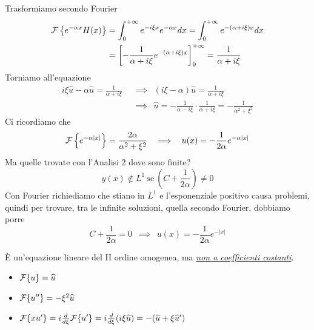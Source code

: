 Trasformiamo secondo Fourier
\begin{equation*}
\begin{aligned}
\mathcal{F} \left\{e^{- \alpha x} H(x)\right\} & = \int^{+ \infty}_{0} e^{- i\xi x} e^{- \alpha x} dx = \int^{+ \infty}_{0} e^{- (\alpha + i\xi) x} dx\\
 & = \left[ - \frac{1}{\alpha + i\xi} e^{- (\alpha + i\xi) x}\right]^{+ \infty}_{0} = \frac{1}{\alpha + i\xi}
\end{aligned}
\end{equation*}
Torniamo all'equazione
\begin{equation*}
\begin{aligned}
i\xi \hat{u} - \alpha \hat{u} = \frac{1}{\alpha + i\xi} \ \  & \implies \ \ (i\xi - \alpha)\hat{u} = \frac{1}{\alpha + i\xi}\\
 & \implies \ \ \hat{u} = - \frac{1}{\alpha - i\xi} \cdot \frac{1}{\alpha + i\xi} = - \frac{1}{\alpha^{2} + \xi^{2}}
\end{aligned}
\end{equation*}
Ci ricordiamo che
\begin{equation*}
\mathcal{F} \left\{e^{- \alpha | x|}\right\} = \frac{2\alpha}{\alpha^{2} + \xi^{2}} \ \ \implies \ \ u(x) = - \frac{1}{2\alpha} e^{- \alpha | x|}
\end{equation*}
Ma quelle trovate con l'Analisi 2 dove sono finite?
\begin{equation*}
y(x) \notin L^{1} \ \text{se} \ \left(C + \frac{1}{2\alpha}\right) \neq 0
\end{equation*}
Con Fourier richiediamo che stiano in $L^{1}$ e l'esponenziale positivo causa problemi, quindi per trovare, tra le infinite soluzioni, quella secondo Fourier, dobbiamo porre
\begin{equation*}
C + \frac{1}{2\alpha} = 0\ \ \implies \ \ u(x) = - \frac{1}{2\alpha} e^{- | x|}
\end{equation*}
\Soluzione

È un'equazione lineare del II ordine omogenea, ma \textit{\underline{non a coefficienti costanti}}.
\begin{itemize}
\item $\mathcal{F} \{u\} = \widehat{u}$
\item $\mathcal{F} \{u''\} = - \xi^{2}\widehat{u}$
\item $\mathcal{F} \{xu'\} = i\frac{d}{d\xi}\mathcal{F} \{u'\} = i\frac{d}{d\xi}(i\xi \widehat{u}) = - (\widehat{u} + \xi \widehat{u} ')$
\end{itemize}

